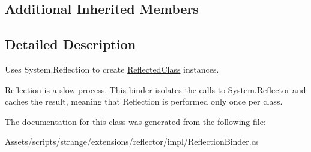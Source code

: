\subsection*{Additional Inherited Members}


\subsection{Detailed Description}
Uses System.\-Reflection to create {\ttfamily \hyperlink{classstrange_1_1extensions_1_1reflector_1_1impl_1_1_reflected_class}{Reflected\-Class}} instances. 

Reflection is a slow process. This binder isolates the calls to System.\-Reflector and caches the result, meaning that Reflection is performed only once per class. 

The documentation for this class was generated from the following file\-:\begin{DoxyCompactItemize}
\item 
Assets/scripts/strange/extensions/reflector/impl/Reflection\-Binder.\-cs\end{DoxyCompactItemize}
